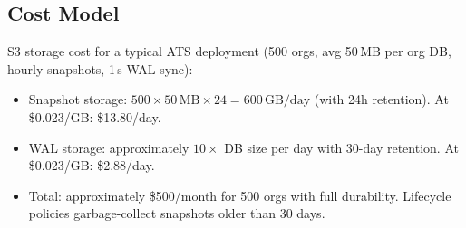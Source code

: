 \subsection{Cost Model}

S3 storage cost for a typical ATS deployment (500 orgs, avg 50\,MB
per org DB, hourly snapshots, 1\,s WAL sync):

\begin{itemize}[nosep]
  \item Snapshot storage: $500 \times 50\,\text{MB} \times 24 = 600\,\text{GB/day}$
    (with 24h retention). At \$0.023/GB: \$13.80/day.
  \item WAL storage: approximately $10\times$ DB size per day with
    30-day retention. At \$0.023/GB: \$2.88/day.
  \item Total: approximately \$500/month for 500 orgs with full
    durability. Lifecycle policies garbage-collect snapshots older
    than 30 days.
\end{itemize}

